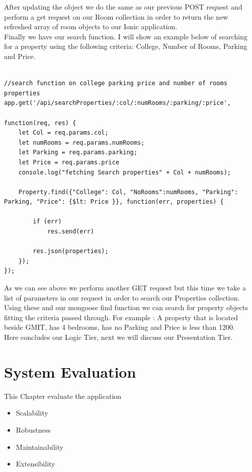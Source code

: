 After updating the object we do the same as our previous POST request and perform a get request on our Room collection in order to return the new refreshed array of room objects to our Ionic application.\\


Finally we have our search function. I will show an example below of searching for a property using the following criteria: College, Number of Rooms, Parking and Price.\\


\begin{verbatim}

//search function on college parking price and number of rooms properties
app.get('/api/searchProperties/:col/:numRooms/:parking/:price', 

function(req, res) {
	let Col = req.params.col;
	let numRooms = req.params.numRooms;
	let Parking = req.params.parking;
	let Price = req.params.price
	console.log("fetching Search properties" + Col + numRooms);

	Property.find({"College": Col, "NoRooms":numRooms, "Parking": Parking, "Price": {$lt: Price }}, function(err, properties) {

		if (err)
			res.send(err)

		res.json(properties); 
	});
});

\end{verbatim}


As we can see above we perform another GET request but this time we take a list of parameters in our request in order to search our Properties collection. Using these and our mongoose find function we can search for property objects fitting the criteria passed through. For example : A property that is located beside GMIT, has 4 bedrooms, has no Parking and Price is less than 1200.\\

Here concludes our Logic Tier, next we will discuss our Presentation Tier.





\chapter{System Evaluation}
This Chapter evaluate the application
\begin{itemize}
    \item Scalability
    \item Robustness
    \item Maintainability
    \item Extensibility
\end{itemize}

